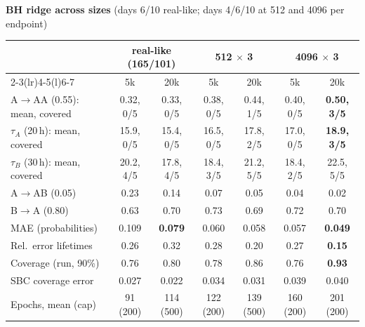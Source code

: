 \documentclass[10pt,a4paper]{article}
\newcommand{\tA}{$\tau_A$}
\newcommand{\tB}{$\tau_B$}
\begin{document}
\begin{center}\footnotesize
\textbf{BH ridge across sizes} (days 6/10 real-like; days 4/6/10 at 512 and 4096 per endpoint)\\[2pt]
\setlength{\tabcolsep}{4pt}
\begin{tabular}{@{}lcccccc@{}}\toprule
 & \multicolumn{2}{c}{real-like (165/101)} & \multicolumn{2}{c}{512 $\times$ 3} & \multicolumn{2}{c}{4096 $\times$ 3} \\\cmidrule(lr){2-3}\cmidrule(lr){4-5}\cmidrule(l){6-7}
 & 5k & 20k & 5k & 20k & 5k & 20k \\\midrule
A$\to$AA (0.55): mean, covered & 0.32, 0/5 & 0.33, 0/5 & 0.38, 0/5 & 0.44, 1/5 & 0.40, 0/5 & \textbf{0.50, 3/5} \\
\tA{} (20\,h): mean, covered & 15.9, 0/5 & 15.4, 0/5 & 16.5, 0/5 & 17.8, 2/5 & 17.0, 0/5 & \textbf{18.9, 3/5} \\
\tB{} (30\,h): mean, covered & 20.2, 4/5 & 17.8, 4/5 & 18.4, 3/5 & 21.2, 5/5 & 18.4, 2/5 & 22.5, 5/5 \\
A$\to$AB (0.05) & 0.23 & 0.14 & 0.07 & 0.05 & 0.04 & 0.02 \\
B$\to$A (0.80) & 0.63 & 0.70 & 0.73 & 0.69 & 0.72 & 0.70 \\
MAE (probabilities) & 0.109 & \textbf{0.079} & 0.060 & 0.058 & 0.057 & \textbf{0.049} \\
Rel.\ error lifetimes & 0.26 & 0.32 & 0.28 & 0.20 & 0.27 & \textbf{0.15} \\
Coverage (run, 90\%) & 0.76 & 0.80 & 0.78 & 0.86 & 0.76 & \textbf{0.93} \\
SBC coverage error & 0.027 & 0.022 & 0.034 & 0.031 & 0.039 & 0.040 \\
Epochs, mean (cap) & 91 (200) & 114 (500) & 122 (200) & 139 (500) & 160 (200) & 201 (200) \\\bottomrule
\end{tabular}


\end{center}
\end{document}
